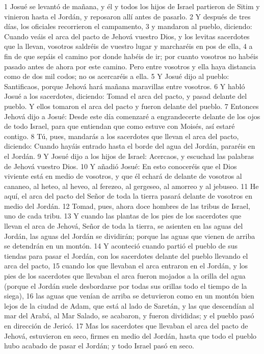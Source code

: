 1 Josué se levantó de mañana, y él y todos los hijos de Israel partieron de Sitim y vinieron hasta el Jordán, y reposaron allí antes de pasarlo.
2 Y después de tres días, los oficiales recorrieron el campamento,
3 y mandaron al pueblo, diciendo: Cuando veáis el arca del pacto de Jehová vuestro Dios, y los levitas sacerdotes que la llevan, vosotros saldréis de vuestro lugar y marcharéis en pos de ella,
4 a fin de que sepáis el camino por donde habéis de ir; por cuanto vosotros no habéis pasado antes de ahora por este camino. Pero entre vosotros y ella haya distancia como de dos mil codos;  no os acercaréis a ella.
5 Y Josué dijo al pueblo: Santificaos, porque Jehová hará mañana maravillas entre vosotros.
6 Y habló Josué a los sacerdotes, diciendo: Tomad el arca del pacto, y pasad delante del pueblo. Y ellos tomaron el arca del pacto y fueron delante del pueblo.
7 Entonces Jehová dijo a Josué: Desde este día comenzaré a engrandecerte delante de los ojos de todo Israel, para que entiendan que como estuve con Moisés, así estaré contigo.
8 Tú, pues, mandarás a los sacerdotes que llevan el arca del pacto, diciendo: Cuando hayáis entrado hasta el borde del agua del Jordán, pararéis en el Jordán.
9 Y Josué dijo a los hijos de Israel: Acercaos, y escuchad las palabras de Jehová vuestro Dios.
10 Y añadió Josué: En esto conoceréis que el Dios viviente está en medio de vosotros, y que él echará de delante de vosotros al cananeo, al heteo, al heveo, al ferezeo, al gergeseo, al amorreo y al jebuseo.
11 He aquí, el arca del pacto del Señor de toda la tierra pasará delante de vosotros en medio del Jordán.
12 Tomad, pues, ahora doce hombres de las tribus de Israel, uno de cada tribu.
13 Y cuando las plantas de los pies de los sacerdotes que llevan el arca de Jehová, Señor de toda la tierra, se asienten en las aguas del Jordán, las aguas del Jordán se dividirán; porque las aguas que vienen de arriba se detendrán en un montón.
14 Y aconteció cuando partió el pueblo de sus tiendas para pasar el Jordán, con los sacerdotes delante del pueblo llevando el arca del pacto,
15 cuando los que llevaban el arca entraron en el Jordán, y los pies de los sacerdotes que llevaban el arca fueron mojados a la orilla del agua (porque el Jordán suele desbordarse por todas sus orillas todo el tiempo de la siega),
16 las aguas que venían de arriba se detuvieron como en un montón bien lejos de la ciudad de Adam, que está al lado de Saretán, y las que descendían al mar del Arabá, al Mar Salado, se acabaron, y fueron divididas; y el pueblo pasó en dirección de Jericó.
17 Mas los sacerdotes que llevaban el arca del pacto de Jehová, estuvieron en seco, firmes en medio del Jordán, hasta que todo el pueblo hubo acabado de pasar el Jordán; y todo Israel pasó en seco.


